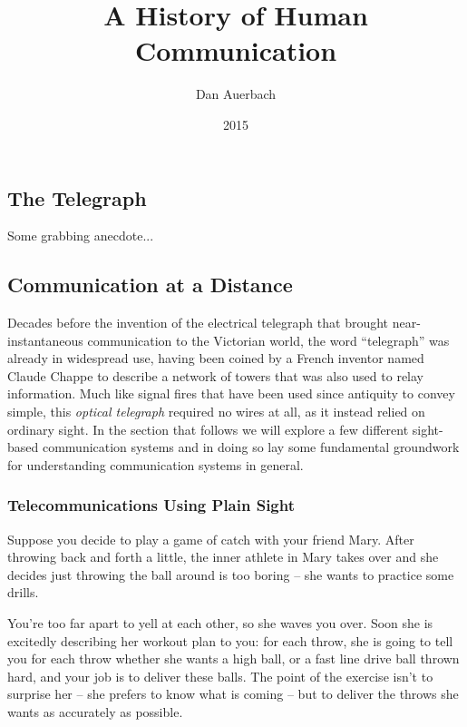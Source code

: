 \documentclass[UTF8]{book}
\begin{document}
\begin{CJK}{UTF8}{gbsn}

\title{A History of Human Communication}
\author{Dan Auerbach}
\date{2015}
\maketitle

\part{The Telegraph}

Some grabbing anecdote...

\chapter{Communication at a Distance}

Decades before the invention of the electrical telegraph that brought near-instantaneous communication to the Victorian world, the word ``telegraph'' was already in widespread use, having been coined by a French inventor named Claude Chappe to describe a network of towers that was also used to relay information. Much like signal fires that have been used since antiquity to convey simple, this \emph{optical telegraph} required no wires at all, as it instead relied on ordinary sight. In the section that follows we will explore a few different sight-based communication systems and in doing so lay some fundamental groundwork for understanding communication systems in general.

\section{Telecommunications Using Plain Sight}

Suppose you decide to play a game of catch with your friend Mary. After throwing back and forth a little, the inner athlete in Mary takes over and she decides just throwing the ball around is too boring -- she wants to practice some drills.

You're too far apart to yell at each other, so she waves you over. Soon she is excitedly describing her workout plan to you: for each throw, she is going to tell you for each throw whether she wants a high ball, or a fast line drive ball thrown hard, and your job is to deliver these balls. The point of the exercise isn't to surprise her -- she prefers to know what is coming -- but to deliver the throws she wants as accurately as possible.


\end{CJK}
\end{document}
